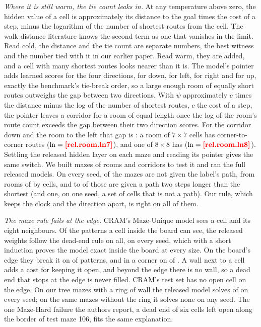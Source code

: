 \emph{Where it is still warm, the tie count leaks in.} At any temperature above zero, the hidden value of a cell is
approximately its distance to the goal times the cost of a step, minus the logarithm of the number of shortest routes
from the cell. The walk-distance literature knows the second term as one that vanishes in the
limit\cite{francoisse2017bag}. Read cold, the distance and the tie count are separate numbers, the best witness and the
number tied with it in our earlier paper. Read warm, they are added, and a cell with many shortest routes looks nearer
than it is. The model's pointer adds learned scores for the four directions,  for down, 
for left,  for right and  for up, exactly the benchmark's tie-break order, so a large
enough room of equally short routes outweighs the gap between two directions. With $\psi$ approximately $c$ times the
distance minus the log of the number of shortest routes, $c$ the cost of a step, the pointer leaves a corridor for a
room of equal length once the log of the room's route count exceeds the gap between their two direction scores. For the
corridor down and the room to the left that gap is : a room of $7\times7$ cells has 
corner-to-corner routes ($\ln = \nm{rel.room.ln7}$), and one of $8\times8$ has  ($\ln =
\nm{rel.room.ln8}$). Settling the released hidden layer on each maze and reading its pointer gives the same switch.
We built  mazes of rooms
and corridors to test it and ran the full released models. On every seed,
 of the mazes are not given the label's path, from rooms of  by
 cells, and  to  of those are given
a path two steps longer than the shortest (and one, on one seed, a set of cells that is not a path). Our rule, which
keeps the clock and the direction apart, is right on all of them.

\emph{The maze rule fails at the edge.} CRAM's Maze-Unique model sees a cell and its eight neighbours. Of the
 patterns a cell inside the board can see, the released weights follow the dead-end rule on all,
on every seed, which with a short induction proves the model exact inside the board at every size. On the board's edge
they break it on  of  patterns, and in a corner on  of
. A wall next to a cell adds a cost for keeping it open, and beyond the edge there is no wall, so a
dead end that stops at the edge is never filled. CRAM's test set has no open cell on the edge. On our  tree
mazes with a ring of wall the released model solves  of  on every seed; on the same
mazes without the ring it solves none on any seed. The one Maze-Hard failure the authors report, a dead end of six
cells left open along the border of test maze 106, fits the same explanation.

